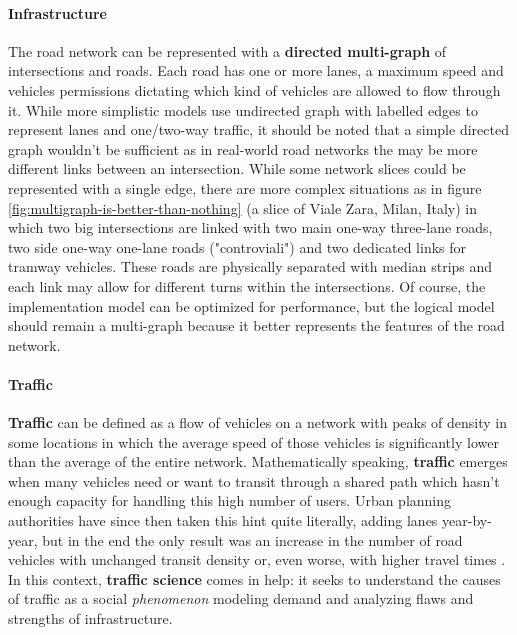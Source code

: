 \paragraph{Infrastructure}

The road network can be represented with a \textbf{directed multi-graph} of intersections and roads. Each road has one or more lanes, a maximum speed and vehicles permissions dictating which kind of vehicles are allowed to flow through it. While more simplistic models use undirected graph with labelled edges to represent lanes and one/two-way traffic, it should be noted that a simple directed graph wouldn't be sufficient as in real-world road networks the may be more different links between an intersection. While some network slices could be represented with a single edge, there are more complex situations as in figure \ref{fig:multigraph-is-better-than-nothing} (a slice of Viale Zara, Milan, Italy) in which two big intersections are linked with two main one-way three-lane roads, two side one-way one-lane roads ("controviali") and two dedicated links for tramway vehicles. These roads are physically separated with median strips and each link may allow for different turns within the intersections. Of course, the implementation model can be optimized for performance, but the logical model should remain a multi-graph because it better represents the features of the road network.


\paragraph{Traffic}

\textbf{Traffic} can be defined as a flow of vehicles on a network with peaks of density in some locations in which the average speed of those vehicles is significantly lower than the average of the entire network.
Mathematically speaking, \textbf{traffic} emerges when many vehicles need or want to transit through a shared path which hasn't enough capacity for handling this high number of users.
Urban planning authorities have since then taken this hint quite literally, adding lanes year-by-year, but in the end the only result was an increase in the number of road vehicles with unchanged transit density or, even worse, with higher travel times \cite{Speck2018}.
In this context, \textbf{traffic science} comes in help: it seeks to understand the causes of traffic as a social \textit{phenomenon} modeling demand and analyzing flaws and strengths of infrastructure.

